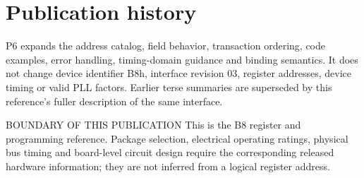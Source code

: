 \documentclass[10pt]{article}
\begin{document}
\section*{Publication history}
P6 expands the address catalog, field behavior, transaction ordering, code examples, error handling, timing-domain guidance and binding semantics. It does not change device identifier B8h, interface revision 03, register addresses, device timing or valid PLL factors. Earlier terse summaries are superseded by this reference's fuller description of the same interface.
\begin{Notice}{BOUNDARY OF THIS PUBLICATION}
This is the B8 register and programming reference. Package selection, electrical operating ratings, physical bus timing and board-level circuit design require the corresponding released hardware information; they are not inferred from a logical register address.
\end{Notice}
\end{document}
